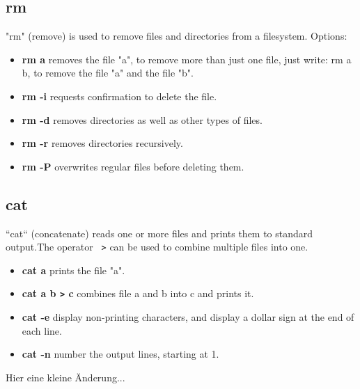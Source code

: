 \documentclass[10pt,a4paper]{scrartcl}
\begin{document}
\subsection{rm}
"rm" (remove) is used to remove files and directories from a filesystem. Options:
\begin{doublespacing}
\begin{itemize}
\item{\bf{rm a}} \qquad removes the file "a", to remove more than just one file, just write: rm a b, to remove the file "a" and the file "b".
\item{\bf{rm -i}} \qquad requests confirmation to delete the file.
\item{\bf{rm -d}} \qquad  removes directories as well as other types of
                 files.
\item{\bf{rm -r}} \qquad removes directories recursively.
\item{\bf{rm -P}} \qquad overwrites regular files before deleting them. 
\end{itemize}
\end{doublespacing}

\subsection{cat}
“cat“ (concatenate) reads one or more files and prints them to standard output.The operator \verb$ >$ can be used to combine multiple files into one.
\begin{doublespacing}
\begin{itemize}
\item{\bf{cat a}} \qquad prints the file "a".
\item{\bf{cat a b \verb$>$ c}} \qquad combines file a and b into c and prints it.
\item{\bf{cat -e}} \qquad display non-printing characters, and display
             a dollar sign at the end of each line.
\item{\bf{cat -n}} \qquad number the output lines, starting at 1.
\end{itemize}
\end{doublespacing}

Hier eine kleine Änderung...






\end{document}
